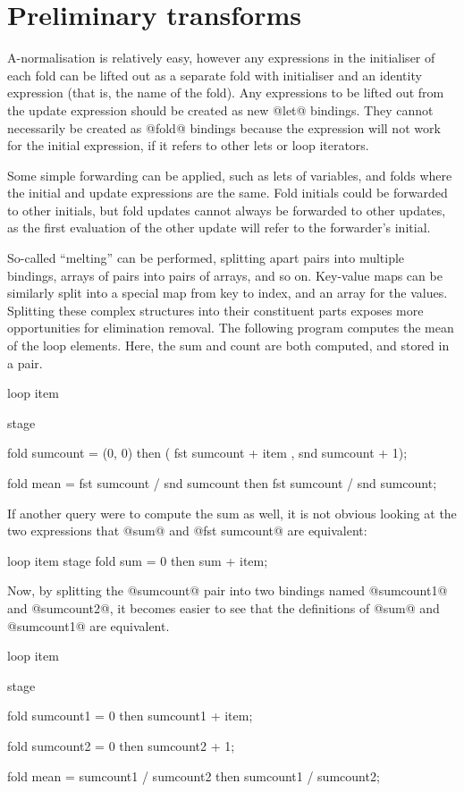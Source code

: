 \section{Preliminary transforms}

A-normalisation is relatively easy, however any expressions in the initialiser of each fold can be lifted out as a separate fold with initialiser and an identity expression (that is, the name of the fold).
Any expressions to be lifted out from the update expression should be created as new @let@ bindings.
They cannot necessarily be created as @fold@ bindings because the expression will not work for the initial expression, if it refers to other lets or loop iterators.

Some simple forwarding can be applied, such as lets of variables, and folds where the initial and update expressions are the same.
Fold initials could be forwarded to other initials, but fold updates cannot always be forwarded to other updates, as the first evaluation of the other update will refer to the forwarder's initial.

So-called ``melting'' can be performed, splitting apart pairs into multiple bindings, arrays of pairs into pairs of arrays, and so on.
Key-value maps can be similarly split into a special map from key to index, and an array for the values.
Splitting these complex structures into their constituent parts exposes more opportunities for elimination removal.
The following program computes the mean of the loop elements. Here, the sum and count are both computed, and stored in a pair.

\begin{code}
loop item {
  stage {
    fold sumcount
     = (0, 0)
     then
       ( fst sumcount + item
       , snd sumcount + 1);

    fold mean
     = fst sumcount / snd sumcount
     then
       fst sumcount / snd sumcount;
  }
}
\end{code}

If another query were to compute the sum as well, it is not obvious looking at the two expressions that @sum@ and @fst sumcount@ are equivalent:
\begin{code}
loop item {
  stage {
    fold sum
     = 0
     then
       sum + item;
  }
}
\end{code}

Now, by splitting the @sumcount@ pair into two bindings named @sumcount1@ and @sumcount2@, it becomes easier to see that the definitions of @sum@ and @sumcount1@ are equivalent.
\begin{code}
loop item {
  stage {
    fold sumcount1
     = 0
     then
       sumcount1 + item;

    fold sumcount2
     = 0
     then
       sumcount2 + 1;

    fold mean
     = sumcount1 / sumcount2
     then
       sumcount1 / sumcount2;
  }
}
\end{code}


